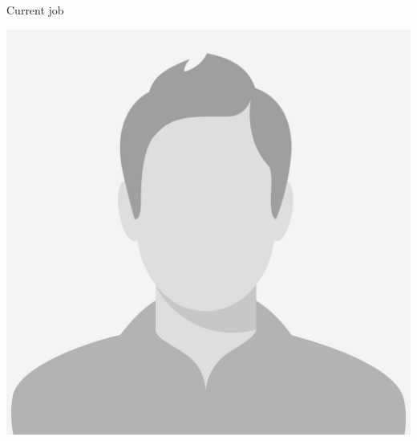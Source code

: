 \documentclass[american]{cv-class}
\begin{document}
{Current job}

\vspace{1.15cm}

\begin{aside}
	\includegraphics[scale=0.10]{img/photo.png}
	~
	\vspace{0.35cm}

\end{aside}
\end{document}
